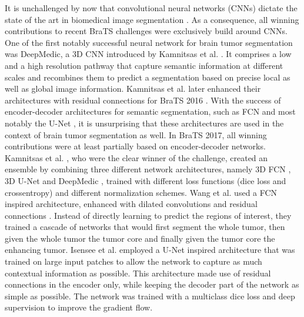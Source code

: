 \documentclass{templates/llncs} %
\begin{document}
	It is unchallenged by now that convolutional neural networks (CNNs) dictate the state of the art in biomedical image segmentation \cite{kamnitsas2017efficient,isensee2017brain,li2017h,isensee2017automatic,kamnitsas2017ensembles,wang2017automatic}. As a consequence, all winning contributions to recent BraTS challenges were exclusively build around CNNs. One of the first notably successful neural network for brain tumor segmentation was DeepMedic, a 3D CNN introduced by Kamnitsas et al. \cite{kamnitsas2017efficient}. It comprises a low and a high resolution pathway that capture semantic information at different scales and recombines them to predict a segmentation based on precise local as well as global image information. Kamnitsas et al. later enhanced their architectures with residual connections for BraTS 2016 \cite{kamnitsas2016deepmedic}. 
	With the success of encoder-decoder architectures for semantic segmentation, such as FCN \cite{long2015fully,chen2018deeplab} and most notably the U-Net \cite{ronneberger2015u}, it is unsurprising that these architectures are used in the context of brain tumor segmentation as well. In BraTS 2017, all winning contributions were at least partially based on encoder-decoder networks. Kamnitsas et al. \cite{kamnitsas2017ensembles}, who were the clear winner of the challenge, created an ensemble by combining three different network architectures, namely 3D FCN \cite{long2015fully}, 3D U-Net \cite{cciccek20163d,ronneberger2015u} and DeepMedic \cite{kamnitsas2017efficient}, trained with different loss functions (dice loss \cite{drozdzal2016importance,milletari2016v} and crossentropy) and different normalization schemes. Wang et al. \cite{wang2017automatic} used a FCN inspired architecture, enhanced with dilated convolutions \cite{chen2018deeplab} and residual connections \cite{he2016identity}. Instead of directly learning to predict the regions of interest, they trained a cascade of networks that would first segment the whole tumor, then given the whole tumor the tumor core and finally given the tumor core the enhancing tumor. Isensee et al. \cite{isensee2017brain} employed a U-Net inspired architecture that was trained on large input patches to allow the network to capture as much contextual information as possible. This architecture made use of residual connections \cite{he2016identity} in the encoder only, while keeping the decoder part of the network as simple as possible. The network was trained with a multiclass dice loss and deep supervision to improve the gradient flow.
	
\end{document}
